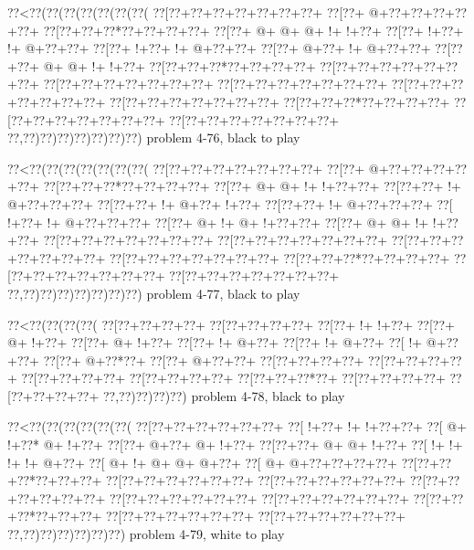 \vbox{\vbox{\goo
\0??<\0??(\0??(\0??(\0??(\0??(\0??(\0??(
\0??[\0??+\0??+\0??+\0??+\0??+\0??+\0??+
\0??[\0??+\- @+\0??+\0??+\0??+\0??+\0??+
\0??[\0??+\0??+\0??*\0??+\0??+\0??+\0??+
\0??[\0??+\- @+\- @+\- @+\- !+\- !+\0??+
\0??[\0??+\- !+\0??+\- !+\- @+\0??+\0??+
\0??[\0??+\- !+\0??+\- !+\- @+\0??+\0??+
\0??[\0??+\- @+\0??+\- !+\- @+\0??+\0??+
\0??[\0??+\0??+\- @+\- @+\- !+\- !+\0??+
\0??[\0??+\0??+\0??*\0??+\0??+\0??+\0??+
\0??[\0??+\0??+\0??+\0??+\0??+\0??+\0??+
\0??[\0??+\0??+\0??+\0??+\0??+\0??+\0??+
\0??[\0??+\0??+\0??+\0??+\0??+\0??+\0??+
\0??[\0??+\0??+\0??+\0??+\0??+\0??+\0??+
\0??[\0??+\0??+\0??+\0??+\0??+\0??+\0??+
\0??[\0??+\0??+\0??*\0??+\0??+\0??+\0??+
\0??[\0??+\0??+\0??+\0??+\0??+\0??+\0??+
\0??[\0??+\0??+\0??+\0??+\0??+\0??+\0??+
\0??,\0??)\0??)\0??)\0??)\0??)\0??)\0??)
}
\hfil problem 4-76, black to play\hfil\break
}

\vbox{\vbox{\goo
\0??<\0??(\0??(\0??(\0??(\0??(\0??(\0??(
\0??[\0??+\0??+\0??+\0??+\0??+\0??+\0??+
\0??[\0??+\- @+\0??+\0??+\0??+\0??+\0??+
\0??[\0??+\0??+\0??*\0??+\0??+\0??+\0??+
\0??[\0??+\- @+\- @+\- !+\- !+\0??+\0??+
\0??[\0??+\0??+\- !+\- @+\0??+\0??+\0??+
\0??[\0??+\0??+\- !+\- @+\0??+\- !+\0??+
\0??[\0??+\0??+\- !+\- @+\0??+\0??+\0??+
\0??[\- !+\0??+\- !+\- @+\0??+\0??+\0??+
\0??[\0??+\- @+\- !+\- @+\- !+\0??+\0??+
\0??[\0??+\- @+\- @+\- !+\- !+\0??+\0??+
\0??[\0??+\0??+\0??+\0??+\0??+\0??+\0??+
\0??[\0??+\0??+\0??+\0??+\0??+\0??+\0??+
\0??[\0??+\0??+\0??+\0??+\0??+\0??+\0??+
\0??[\0??+\0??+\0??+\0??+\0??+\0??+\0??+
\0??[\0??+\0??+\0??*\0??+\0??+\0??+\0??+
\0??[\0??+\0??+\0??+\0??+\0??+\0??+\0??+
\0??[\0??+\0??+\0??+\0??+\0??+\0??+\0??+
\0??,\0??)\0??)\0??)\0??)\0??)\0??)\0??)
}
\hfil problem 4-77, black to play\hfil\break
}

\vbox{\vbox{\goo
\0??<\0??(\0??(\0??(\0??(
\0??[\0??+\0??+\0??+\0??+
\0??[\0??+\0??+\0??+\0??+
\0??[\0??+\- !+\- !+\0??+
\0??[\0??+\- @+\- !+\0??+
\0??[\0??+\- @+\- !+\0??+
\0??[\0??+\- !+\- @+\0??+
\0??[\0??+\- !+\- @+\0??+
\0??[\- !+\- @+\0??+\0??+
\0??[\0??+\- @+\0??*\0??+
\0??[\0??+\- @+\0??+\0??+
\0??[\0??+\0??+\0??+\0??+
\0??[\0??+\0??+\0??+\0??+
\0??[\0??+\0??+\0??+\0??+
\0??[\0??+\0??+\0??+\0??+
\0??[\0??+\0??+\0??*\0??+
\0??[\0??+\0??+\0??+\0??+
\0??[\0??+\0??+\0??+\0??+
\0??,\0??)\0??)\0??)\0??)
}
\hfil problem 4-78, black to play\hfil\break
}

\vbox{\vbox{\goo
\0??<\0??(\0??(\0??(\0??(\0??(\0??(
\0??[\0??+\0??+\0??+\0??+\0??+\0??+
\0??[\- !+\0??+\- !+\- !+\0??+\0??+
\0??[\- @+\- !+\0??*\- @+\- !+\0??+
\0??[\0??+\- @+\0??+\- @+\- !+\0??+
\0??[\0??+\0??+\- @+\- @+\- !+\0??+
\0??[\- !+\- !+\- !+\- !+\- @+\0??+
\0??[\- @+\- !+\- @+\- @+\- @+\0??+
\0??[\- @+\- @+\0??+\0??+\0??+\0??+
\0??[\0??+\0??+\0??*\0??+\0??+\0??+
\0??[\0??+\0??+\0??+\0??+\0??+\0??+
\0??[\0??+\0??+\0??+\0??+\0??+\0??+
\0??[\0??+\0??+\0??+\0??+\0??+\0??+
\0??[\0??+\0??+\0??+\0??+\0??+\0??+
\0??[\0??+\0??+\0??+\0??+\0??+\0??+
\0??[\0??+\0??+\0??*\0??+\0??+\0??+
\0??[\0??+\0??+\0??+\0??+\0??+\0??+
\0??[\0??+\0??+\0??+\0??+\0??+\0??+
\0??,\0??)\0??)\0??)\0??)\0??)\0??)
}
\hfil problem 4-79, white to play\hfil\break
}

